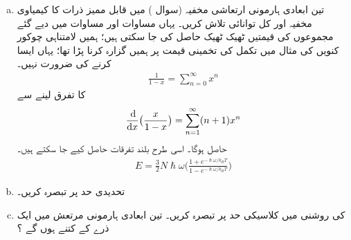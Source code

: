 \begin{enumerate}[a.]
\item
تین ابعادی ہارمونی ارتعاشی مخفیہ (سوال ) میں قابل ممیز ذرات کا کیمیاوی مخفیہ اور کل توانائی تلاش کریں۔  یہاں مساوات  اور مساوات  میں دیے گئے مجموعوں کی قیمتیں ٹھیک ٹھیک حاصل کی جا سکتی ہیں؛ ہمیں لامتناہی چوکور کنویں کی مثال میں تکمل کی تخمینی قیمت پر ہمیں گزارہ کرنا پڑا تھا؛ یہاں ایسا کرنے کی ضرورت نہیں۔  
\begin{align}
\frac{1}{1 - x} = \sum_{n = 0}^{\infty} x^{n}
\end{align}
کا تفرق لینے سے 
\begin{align*}
\frac{\dif}{\dif x} \big ( \frac{x}{1 - x} \big ) = \sum_{n = 1}^{\infty} (n + 1) x^{n}
\end{align*}
حاصل ہوگا۔ اسی طرح بلند تفرقات حاصل کیے جا سکتے ہیں۔  
\begin{align}
E = \frac{3}{2} N \hslash \omega \big ( \frac{1 + e^{- \hslash \omega / k_B T}}{1 - e^{- \hslash \omega / k_B T}} \big )
\end{align}
\item
تحدیدی حد  پر تبصرہ کریں۔
\item
{} کی روشنی میں کلاسیکی حد  پر تبصرہ کریں۔ تین ابعادی ہارمونی مرتعش میں ایک ذرے کے  کتنے ہوں گے ؟
\end{enumerate}

